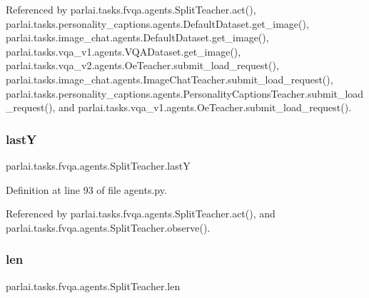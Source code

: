 Referenced by parlai.\+tasks.\+fvqa.\+agents.\+Split\+Teacher.\+act(), parlai.\+tasks.\+personality\+\_\+captions.\+agents.\+Default\+Dataset.\+get\+\_\+image(), parlai.\+tasks.\+image\+\_\+chat.\+agents.\+Default\+Dataset.\+get\+\_\+image(), parlai.\+tasks.\+vqa\+\_\+v1.\+agents.\+V\+Q\+A\+Dataset.\+get\+\_\+image(), parlai.\+tasks.\+vqa\+\_\+v2.\+agents.\+Oe\+Teacher.\+submit\+\_\+load\+\_\+request(), parlai.\+tasks.\+image\+\_\+chat.\+agents.\+Image\+Chat\+Teacher.\+submit\+\_\+load\+\_\+request(), parlai.\+tasks.\+personality\+\_\+captions.\+agents.\+Personality\+Captions\+Teacher.\+submit\+\_\+load\+\_\+request(), and parlai.\+tasks.\+vqa\+\_\+v1.\+agents.\+Oe\+Teacher.\+submit\+\_\+load\+\_\+request().

\mbox{\label{classparlai_1_1tasks_1_1fvqa_1_1agents_1_1SplitTeacher_a1579ae960bedae2a943961e9bdb2edb6}} 
\subsubsection{\texorpdfstring{lastY}{lastY}}
{\footnotesize\ttfamily parlai.\+tasks.\+fvqa.\+agents.\+Split\+Teacher.\+lastY}



Definition at line 93 of file agents.\+py.



Referenced by parlai.\+tasks.\+fvqa.\+agents.\+Split\+Teacher.\+act(), and parlai.\+tasks.\+fvqa.\+agents.\+Split\+Teacher.\+observe().

\mbox{\label{classparlai_1_1tasks_1_1fvqa_1_1agents_1_1SplitTeacher_a6543ea6773174b7e252eae4bd4bf7568}} 
\subsubsection{\texorpdfstring{len}{len}}
{\footnotesize\ttfamily parlai.\+tasks.\+fvqa.\+agents.\+Split\+Teacher.\+len}



